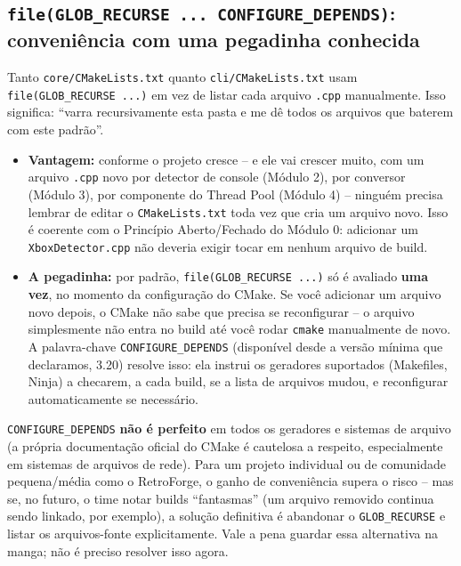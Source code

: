 \subsection{\texttt{file(GLOB\_RECURSE ... CONFIGURE\_DEPENDS)}: conveniência com uma pegadinha conhecida}

Tanto \texttt{core/CMakeLists.txt} quanto \texttt{cli/CMakeLists.txt} usam \texttt{file(GLOB\_RECURSE ...)} em vez de listar cada arquivo \texttt{.cpp} manualmente. Isso significa: ``varra recursivamente esta pasta e me dê todos os arquivos que baterem com este padrão''.

\begin{itemize}
    \item \textbf{Vantagem:} conforme o projeto cresce -- e ele vai crescer muito, com um arquivo \texttt{.cpp} novo por detector de console (Módulo 2), por conversor (Módulo 3), por componente do Thread Pool (Módulo 4) -- ninguém precisa lembrar de editar o \texttt{CMakeLists.txt} toda vez que cria um arquivo novo. Isso é coerente com o Princípio Aberto/Fechado do Módulo 0: adicionar um \texttt{XboxDetector.cpp} não deveria exigir tocar em nenhum arquivo de build.
    \item \textbf{A pegadinha:} por padrão, \texttt{file(GLOB\_RECURSE ...)} só é avaliado \textbf{uma vez}, no momento da configuração do CMake. Se você adicionar um arquivo novo depois, o CMake não sabe que precisa se reconfigurar -- o arquivo simplesmente não entra no build até você rodar \texttt{cmake} manualmente de novo. A palavra-chave \texttt{CONFIGURE\_DEPENDS} (disponível desde a versão mínima que declaramos, 3.20) resolve isso: ela instrui os geradores suportados (Makefiles, Ninja) a checarem, a cada build, se a lista de arquivos mudou, e reconfigurar automaticamente se necessário.
\end{itemize}

\begin{CaixaAlerta}
\texttt{CONFIGURE\_DEPENDS} \textbf{não é perfeito} em todos os geradores e sistemas de arquivo (a própria documentação oficial do CMake é cautelosa a respeito, especialmente em sistemas de arquivos de rede). Para um projeto individual ou de comunidade pequena/média como o RetroForge, o ganho de conveniência supera o risco -- mas se, no futuro, o time notar builds ``fantasmas'' (um arquivo removido continua sendo linkado, por exemplo), a solução definitiva é abandonar o \texttt{GLOB\_RECURSE} e listar os arquivos-fonte explicitamente. Vale a pena guardar essa alternativa na manga; não é preciso resolver isso agora.
\end{CaixaAlerta}

